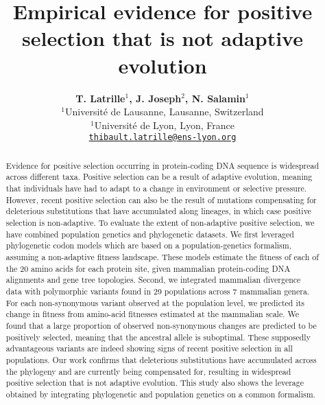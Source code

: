 \documentclass{article}
\title{Empirical evidence for positive selection that is not adaptive evolution}
\author{
    \large
    \textbf{T. {Latrille}$^{1}$, J. {Joseph}$^{2}$, N. {Salamin}$^{1}$}\\
    \normalsize
    $^{1}$Université de Lausanne, Lausanne, Switzerland\\
    $^{1}$Université de Lyon, Lyon, France \\
    \texttt{\href{mailto:thibault.latrille@ens-lyon.org}{thibault.latrille@ens-lyon.org}} \\
}
\begin{document}
    \maketitle

    \begin{abstract}
        Evidence for positive selection occurring in protein-coding DNA sequence is widespread across different taxa.
        Positive selection can be a result of adaptive evolution, meaning that individuals have had to adapt to a change in environment or selective pressure.
        However, recent positive selection can also be the result of mutations compensating for deleterious substitutions that have accumulated along lineages, in which case positive selection is non-adaptive.
        To evaluate the extent of non-adaptive positive selection, we have combined population genetics and phylogenetic datasets.
        We first leveraged phylogenetic codon models which are based on a population-genetics formalism, assuming a non-adaptive fitness landscape.
        These models estimate the fitness of each of the 20 amino acids for each protein site, given mammalian protein-coding DNA alignments and gene tree topologies.
        Second, we integrated mammalian divergence data with polymorphic variants found in 29 populations across 7 mammalian genera.
        For each non-synonymous variant observed at the population level, we predicted its change in fitness from amino-acid fitnesses estimated at the mammalian scale.
        We found that a large proportion of observed non-synonymous changes are predicted to be positively selected, meaning that the ancestral allele is suboptimal.
        These supposedly advantageous variants are indeed showing signs of recent positive selection in all populations.
        Our work confirms that deleterious substitutions have accumulated across the phylogeny and are currently being compensated for, resulting in widespread positive selection that is not adaptive evolution.
        This study also shows the leverage obtained by integrating phylogenetic and population genetics on a common formalism.
    \end{abstract}

\end{document}
